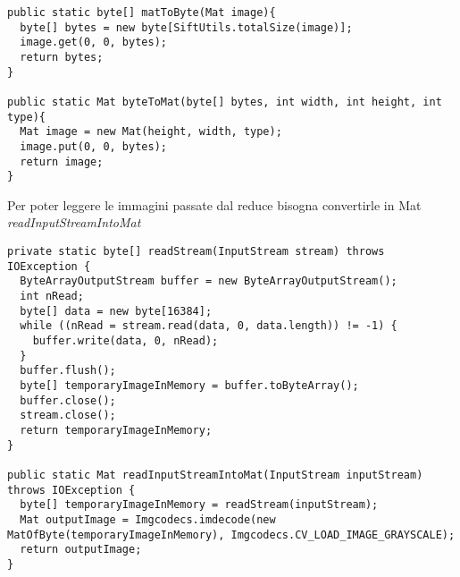 \begin{itemize}
\begin{lstlisting}
public static byte[] matToByte(Mat image){
  byte[] bytes = new byte[SiftUtils.totalSize(image)];
  image.get(0, 0, bytes);
  return bytes;
}

public static Mat byteToMat(byte[] bytes, int width, int height, int type){
  Mat image = new Mat(height, width, type);
  image.put(0, 0, bytes);
  return image;
}
\end{lstlisting}
Per poter leggere le immagini passate dal reduce bisogna convertirle in Mat \emph{\textit{readInputStreamIntoMat}}
\begin{lstlisting}
private static byte[] readStream(InputStream stream) throws IOException {
  ByteArrayOutputStream buffer = new ByteArrayOutputStream();
  int nRead;
  byte[] data = new byte[16384];
  while ((nRead = stream.read(data, 0, data.length)) != -1) {
    buffer.write(data, 0, nRead);
  }
  buffer.flush();
  byte[] temporaryImageInMemory = buffer.toByteArray();
  buffer.close();
  stream.close();
  return temporaryImageInMemory;
}

public static Mat readInputStreamIntoMat(InputStream inputStream) throws IOException {
  byte[] temporaryImageInMemory = readStream(inputStream);
  Mat outputImage = Imgcodecs.imdecode(new MatOfByte(temporaryImageInMemory), Imgcodecs.CV_LOAD_IMAGE_GRAYSCALE);
  return outputImage;
}
\end{lstlisting}
\end{itemize}
